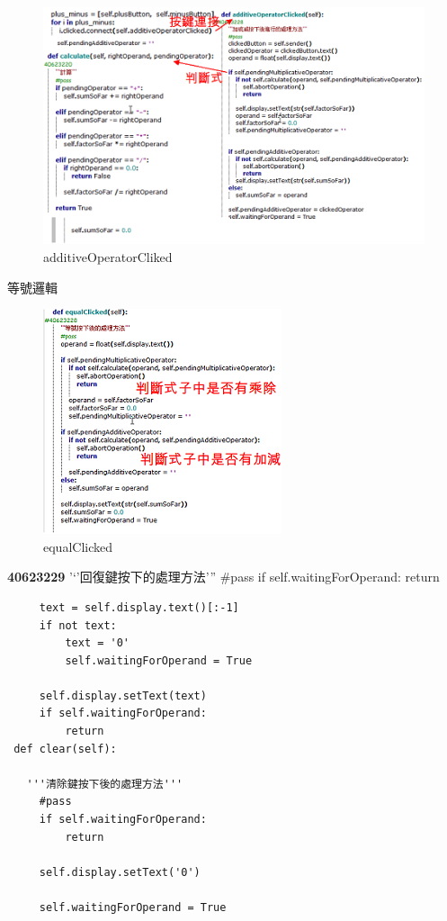 \documentclass[12pt,,]{report}
\begin{document}
\begin{figure}
\centering
\includegraphics{./tex2pdf.2656/f8e1adba5ca9ef4f984bd3136a27e2a06fe35bd7.png}
\caption{additiveOperatorCliked\label{fig:additiveOperatorCliked}}
\end{figure}

等號邏輯

\begin{figure}
\centering
\includegraphics{./tex2pdf.2656/94c8a4b17bc1fa9edb4acf49cbd39f03992fc57d.png}
\caption{equalClicked\label{fig:equalClicked}}
\end{figure}

\textbf{40623229} '`'回復鍵按下的處理方法''' \#pass if
self.waitingForOperand: return

\begin{verbatim}
     text = self.display.text()[:-1]
     if not text:
         text = '0'
         self.waitingForOperand = True

     self.display.setText(text)
     if self.waitingForOperand:
         return
 def clear(self):
  
   '''清除鍵按下後的處理方法'''
     #pass
     if self.waitingForOperand:
         return

     self.display.setText('0')
     
     self.waitingForOperand = True
\end{verbatim}
\end{document}
